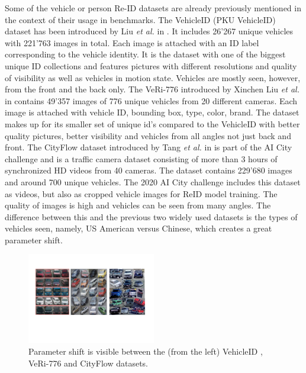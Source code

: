 \documentclass[conference]{IEEEtran} %
\begin{document}
		Some of the vehicle or person Re-ID datasets are already previously mentioned in the context of their usage in benchmarks. The VehicleID (PKU VehicleID) dataset has been introduced by Liu \textit{et al.} in \cite{liu2016deep}. It includes 26'267 unique vehicles with 221'763 images in total. Each image is attached with an ID label corresponding to the vehicle identity. It is the dataset with one of the biggest unique ID collections and features pictures with different resolutions and quality of visibility as well as vehicles in motion state. Vehicles are mostly seen, however, from the front and the back only. The VeRi-776 introduced by Xinchen Liu \textit{et al.} in \cite{liu2016deep2} contains 49'357 images of 776 unique vehicles from 20 different cameras. Each image is attached with vehicle ID, bounding box, type, color, brand. The dataset makes up for its smaller set of unique id's compared to the VehicleID with better quality pictures, better visibility and vehicles from all angles not just back and front. The CityFlow dataset introduced by Tang \textit{et al.} in \cite{tang2019cityflow} is part of the AI City challenge and is a traffic camera dataset consisting of more than 3 hours of synchronized HD videos from 40 cameras. The dataset contains 229'680 images and around 700 unique vehicles. The 2020 AI City challenge \cite{aicity2020data} includes this dataset as videos, but also as cropped vehicle images for ReID model training. The quality of images is high and vehicles can be seen from many angles. The difference between this and the previous two widely used datasets is the types of vehicles seen, namely, US American versus Chinese, which creates a great parameter shift.
	
	 \begin{figure}[t]
		\centering
		\includegraphics[width=0.5\textwidth]{re_id_diagramma_2.png} %
		\caption{Parameter shift is visible between the (from the left) VehicleID \cite{liu2016deep}, VeRi-776 \cite{liu2016deep2} and CityFlow datasets.}
		\label{fig:fig2} %
	\end{figure}
	
\end{document}
